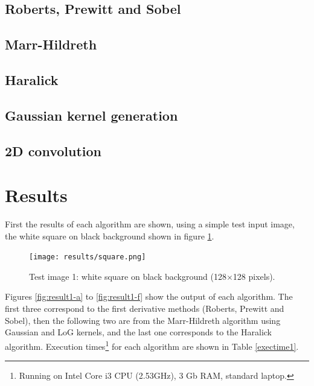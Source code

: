 \documentclass{ipol}
\numberwithin{equation}{section}
\numberwithin{table}{section}
\numberwithin{figure}{section}
\begin{document}
\subsection{Roberts, Prewitt and Sobel}


\subsection{Marr-Hildreth}
\label{app:marr-hildreth}


\subsection{Haralick}


\subsection{Gaussian kernel generation}


\subsection{2D convolution}



\section{Results}
\label{sec:results}

First the results of each algorithm are shown, using a simple test input image, the white square on black background shown in figure \ref{fig:original1}. \\

\begin{figure}[h!]
	\centering
	\texttt{[image: results/square.png]}
	\caption{Test image 1: white square on black background (128$\times$128 pixels).}
	\label{fig:original1}
\end{figure}

Figures \ref{fig:result1-a} to \ref{fig:result1-f} show the output of each algorithm. The first three correspond to the first derivative methods (Roberts, Prewitt and Sobel), then the following two are from the Marr-Hildreth algorithm using Gaussian and LoG kernels, and the last one corresponds to the Haralick algorithm. Execution times\footnote{Running on Intel Core i3 CPU (2.53GHz), 3 Gb RAM, standard laptop.} for each algorithm are shown in Table \ref{exectime1}. \\
\end{document}
